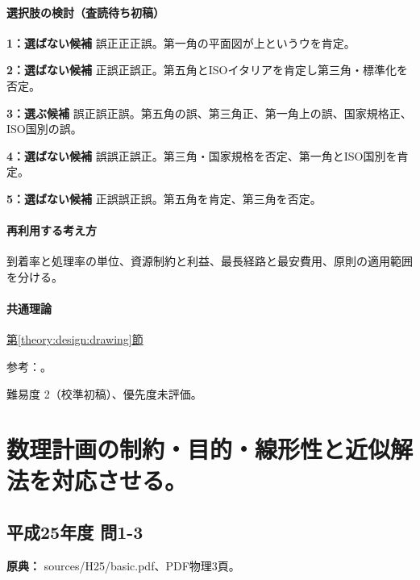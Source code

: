 \paragraph{選択肢の検討（査読待ち初稿）}\mbox{}\par

\noindent\textbf{1：選ばない候補} 誤正正正誤。第一角の平面図が上というウを肯定。\par

\noindent\textbf{2：選ばない候補} 正誤正誤正。第五角とISOイタリアを肯定し第三角・標準化を否定。\par

\noindent\textbf{3：選ぶ候補} 誤正誤正誤。第五角の誤、第三角正、第一角上の誤、国家規格正、ISO国別の誤。\par

\noindent\textbf{4：選ばない候補} 誤誤正誤正。第三角・国家規格を否定、第一角とISO国別を肯定。\par

\noindent\textbf{5：選ばない候補} 正誤誤正誤。第五角を肯定、第三角を否定。\par

\paragraph{再利用する考え方} 到着率と処理率の単位、資源制約と利益、最長経路と最安費用、原則の適用範囲を分ける。

\paragraph{共通理論} \hyperref[theory:design:drawing]{第\ref*{theory:design:drawing}節}

\par 参考：\cite{design48_iso}。

\par 難易度 2（校準初稿）、優先度未評価。

\section{数理計画の制約・目的・線形性と近似解法を対応させる。}

\subsection{平成25年度 問1-3}
\label{q:h25-reg-basic-1-3}

\noindent\textbf{原典：} sources/H25/basic.pdf、PDF物理3頁。

